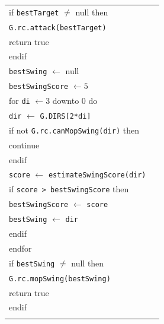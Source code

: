 \documentclass{article}
\newenvironment{pseudobox}
{
\centering
\begin{longtable}{|p{0.94\linewidth}|}
\hline
}
{
\\ \hline
\end{longtable}
\vspace{0.05cm}
}
\begin{document}
\begin{enumerate}[label=\alph*.]
\begin{enumerate}[label=\alph*.]
\begin{pseudobox}
\hspace*{1.5em}if \texttt{bestTarget} $\neq$ null then \\
\hspace*{3em}\texttt{G.rc.attack(bestTarget)} \\
\hspace*{3em}return true \\
\hspace*{1.5em}endif \\

\hspace*{1.5em}\texttt{bestSwing} $\leftarrow$ null \\
\hspace*{1.5em}\texttt{bestSwingScore} $\leftarrow 5$ \\

\hspace*{1.5em}for \texttt{di} $\leftarrow 3$ downto 0 do \\
\hspace*{3em}\texttt{dir} $\leftarrow$ \texttt{G.DIRS[2*di]} \\
\hspace*{3em}if not \texttt{G.rc.canMopSwing(dir)} then \\
\hspace*{4.5em}continue \\
\hspace*{3em}endif \\

\hspace*{3em}\texttt{score} $\leftarrow$ \texttt{estimateSwingScore(dir)} \\
\hspace*{3em}if \texttt{score > bestSwingScore} then \\
\hspace*{4.5em}\texttt{bestSwingScore} $\leftarrow$ \texttt{score} \\
\hspace*{4.5em}\texttt{bestSwing} $\leftarrow$ \texttt{dir} \\
\hspace*{3em}endif \\
\hspace*{1.5em}endfor \\

\hspace*{1.5em}if \texttt{bestSwing} $\neq$ null then \\
\hspace*{3em}\texttt{G.rc.mopSwing(bestSwing)} \\
\hspace*{3em}return true \\
\hspace*{1.5em}endif \\


\end{pseudobox}
\end{enumerate}
\end{enumerate}
\end{document}
